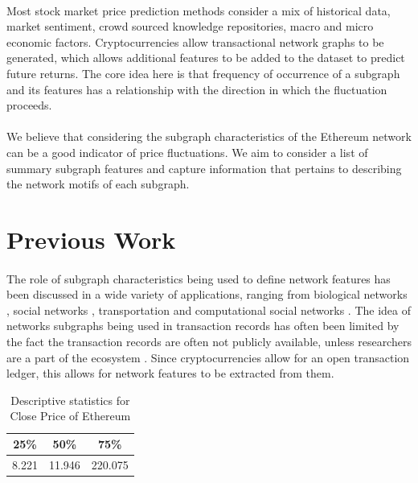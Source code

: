\documentclass[12pt]{article}%
\begin{document}
\paragraph{}Most stock market price prediction methods consider a mix of historical data, market sentiment, crowd sourced knowledge repositories, macro and micro economic factors. Cryptocurrencies allow transactional network graphs to be generated, which allows additional features to be added to the dataset to predict future returns. The core idea here is that frequency of occurrence of a subgraph and its features has a relationship with the direction in which the fluctuation proceeds.
\paragraph{}We believe that considering the subgraph characteristics of the Ethereum network can be a good indicator of price fluctuations. We aim to consider a list of summary subgraph features and capture information that pertains to describing the network motifs of each subgraph.  

\section{Previous Work}
\paragraph{}The role of subgraph characteristics being used to define network features has been discussed in a wide variety of applications, ranging from biological networks \cite{4}, social networks \cite{5}, transportation \cite{6} and computational social networks \cite{7}. The idea of networks subgraphs being used in transaction records has often been limited by the fact the transaction records are often not publicly available, unless researchers are a part of the ecosystem \cite{8}. Since cryptocurrencies allow for an open transaction ledger, this allows for network features to be extracted from them.


\begin{center}
\begin{table}[h]
\centering
\begin{tabular}{ |c|c|c| } 
 \hline
 25\% & 50\% & 75\%  \\ 
\hline 
 8.221 & 11.946 & 220.075 \\ 
\hline 
\end{tabular}
\\[10pt]
\caption{Descriptive statistics for Close Price of Ethereum}
\end{table}
\end{center}
\end{document}
